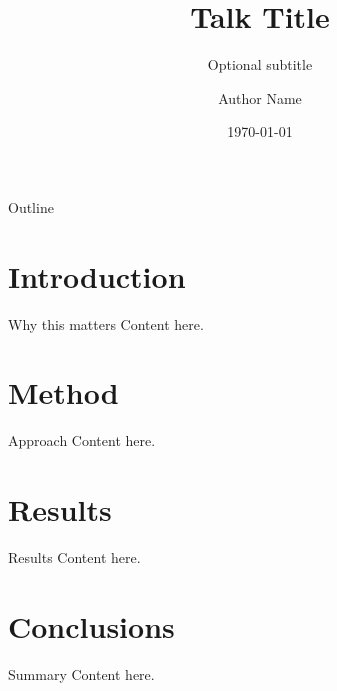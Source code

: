 \documentclass[aspectratio=169]{beamer}
\title{Talk Title}
\subtitle{Optional subtitle}
\author{Author Name}
\institute{Affiliation}
\date{\today}
\begin{document}
\frame{\titlepage}

\begin{frame}{Outline}
    \tableofcontents
\end{frame}

\section{Introduction}
\begin{frame}{Why this matters}
    Content here.
\end{frame}

\section{Method}
\begin{frame}{Approach}
    Content here.
\end{frame}

\section{Results}
\begin{frame}{Results}
    Content here.
\end{frame}

\section{Conclusions}
\begin{frame}{Summary}
    Content here.
\end{frame}
\end{document}
